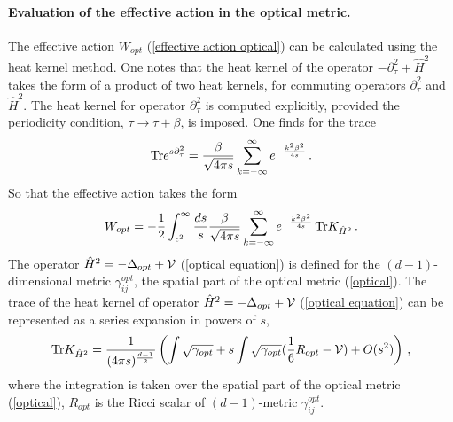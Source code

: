 \documentclass[12pt]{article}
\def\tr{\hbox{Tr}}
\def\Tr{\hbox{Tr}}
\def\be{\begin{eqnarray}}
\def\ee{\end{eqnarray}}
\def\lb{\label}
\def\o{\over}
\begin{document}
\paragraph*{Evaluation of the effective action in the optical metric.}

The effective action $W_{opt}$ (\ref{effective action optical}) can be calculated using the heat kernel method. One notes that the heat kernel of the operator
$-\partial_\tau^2+\hat{H}^2$ takes the form of a product of two heat kernels, for commuting operators $\partial_\tau^2$ and $\hat{H}^2$. The heat kernel for operator
$\partial_\tau^2$ is computed explicitly, provided the periodicity condition, $\tau\rightarrow \tau+\beta$, is imposed. One finds for the trace
\be
\tr e^{s\partial_\tau^2}={\beta\o \sqrt{4\pi s}}\sum_{k=-\infty}^\infty e^{-{k^2\beta^2\o 4s}}\, .
\lb{heat kernel circle}
\ee
So that the effective action takes the form
\be
W_{opt}=-{1\o 2}\int_{\epsilon^2}^\infty {ds\o s}{\beta\o \sqrt{4\pi s}}\sum_{k=-\infty}^\infty e^{-{k^2\beta^2\o 4s}}\, \Tr K_{\hat{H}^2}\, .
\lb{action heat kernel}
\ee
The operator $\hat{H}^2=-\Delta_{opt}+{\cal V}$  (\ref{optical equation}) is defined  for the $(d-1)$-dimensional metric $\gamma_{ij}^{opt}$, the spatial part of the optical metric
(\ref{optical}). The trace of the heat kernel of operator $\hat{H}^2=-\Delta_{opt}+{\cal V}$  (\ref{optical equation}) can be represented as  a series  expansion in powers of $s$,
\be
\tr K_{\hat{H}^2}={1\o (4\pi s)^{d-1\o 2}}\left(\int \sqrt{\gamma_{opt}}+s\int \sqrt{\gamma_{opt}}({1\o 6}R_{opt}-{\cal V})+O(s^2)\right)\, ,
\lb{heat kernel of H}
\ee
where the integration is taken over the spatial part of the optical metric (\ref{optical}), $R_{opt}$ is the Ricci scalar of $(d-1)$-metric $\gamma_{ij}^{opt}$.                   
                       
\end{document}
